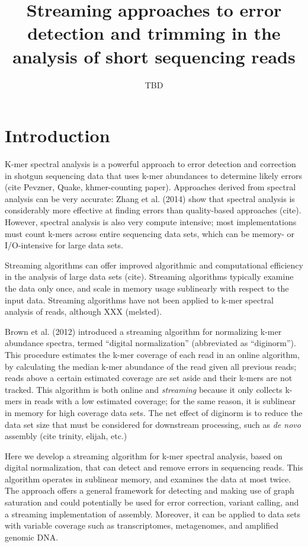 \documentclass{article}
\begin{document}
\title{Streaming approaches to error detection and trimming in the analysis of
short sequencing reads}
\author{TBD}
\maketitle

\section{Introduction}

K-mer spectral analysis is a powerful approach to error detection and
correction in shotgun sequencing data that uses k-mer abundances to
determine likely errors (cite Pevzner, Quake, khmer-counting paper).
Approaches derived from spectral analysis can be very accurate: Zhang
et al. (2014) show that spectral analysis is considerably more
effective at finding errors than quality-based approaches (cite).  However,
spectral analysis is also very compute intensive; most implementations
must count k-mers across entire sequencing data sets, which can be
memory- or I/O-intensive for large data sets.

Streaming algorithms can offer improved algorithmic and computational
efficiency in the analysis of large data sets (cite).  Streaming
algorithms typically examine the data only once, and scale in memory
usage sublinearly with respect to the input data.  Streaming
algorithms have not been applied to k-mer spectral analysis of reads,
although XXX (melsted).

Brown et al. (2012) introduced a streaming algorithm for normalizing
k-mer abundance spectra, termed ``digital normalization'' (abbreviated
as ``diginorm'').  This procedure estimates the k-mer coverage of each
read in an online algorithm, by calculating the median k-mer abundance
of the read given all previous reads; reads above a certain estimated
coverage are set aside and their k-mers are not tracked.  This
algorithm is both online and {\em streaming} because it only collects
k-mers in reads with a low estimated coverage; for the same reason, it
is sublinear in memory for high coverage data sets.  The net effect of
diginorm is to reduce the data set size that must be considered for
downstream processing, such as {\em de novo} assembly (cite trinity,
elijah, etc.)

Here we develop a streaming algorithm for k-mer spectral analysis,
based on digital normalization, that can detect and remove errors in
sequencing reads.  This algorithm operates in sublinear memory, and
examines the data at most twice.  The approach offers a general
framework for detecting and making use of graph saturation and could
potentially be used for error correction, variant calling, and
a streaming implementation of assembly.  Moreover, it can be applied to
data sets with variable coverage such as transcriptomes, metagenomes, and
amplified genomic DNA.
\end{document}
